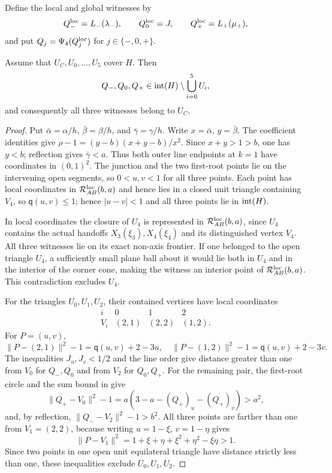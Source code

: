 Define the local and global witnesses by
\begin{equation}
 Q_-^{\rm loc}=L_-(\lambda_-),\qquad
 Q_0^{\rm loc}=J,\qquad
 Q_+^{\rm loc}=L_+(\mu_+),                       \label{eq:asym-witnesses}
\end{equation}
and put $Q_j=\Psi_4(Q_j^{\rm loc})$ for $j\in\{-,0,+\}$.

\begin{lemma}
\label{lem:asymmetric-core-witness}
Assume that $U_C,U_0,\ldots,U_5$ cover $H$.  Then
\[
 Q_-,Q_0,Q_+
 \in\mathrm{int}(H)\setminus\bigcup_{i=0}^5U_i,
\]
and consequently all three witnesses belong to $U_C$.
\end{lemma}

\begin{proof}
Put $\bar\alpha=\alpha/h$, $\bar\beta=\beta/h$, and $\bar\gamma=\gamma/h$.
Write $x=\bar\alpha$, $y=\bar\beta$. The coefficient identities give
$\rho-1=(y-b)(x+y-b)/x^2$. Since $x+y>1>b$, one has $y<b$;
reflection gives $\bar\gamma<a$. Thus both outer line endpoints at
$k=1$ have coordinates in $(0,1)^2$. The junction and the two first-root
points lie on the intervening open segments, so $0<u,v<1$ for all three points.  Each point has local coordinates in $\mathcal R_{AB}^{\rm loc}(b,a)$ and hence
lies in a closed unit triangle containing $V_4$, so
$\mathsf q(u,v)\le1$; hence
$|u-v|<1$ and all three points lie in $\mathrm{int}(H)$.

In local coordinates the closure of $U_4$ is represented in
$\mathcal R_{AB}^{\rm loc}(b,a)$, since $U_4$ contains the actual handoffs
$X_3(\xi_3),X_4(\xi_4)$ and its distinguished vertex $V_4$.  All three witnesses lie
on its exact non-axis frontier.  If one belonged to the open triangle $U_4$,
a sufficiently small plane ball about it would lie both in $U_4$ and in the
interior of the corner cone, making the witness an interior point of
$\mathcal R_{AB}^{\rm loc}(b,a)$. This contradiction excludes $U_4$.

For the triangles $U_0,U_1,U_2$, their contained vertices have local coordinates
\[
 \begin{array}{c|ccc}
 i&0&1&2\\ \hline
 V_i&(2,1)&(2,2)&(1,2).
 \end{array}
\]
For $P=(u,v)$,
\[
 \lVert P-(2,1)\rVert^2-1=\mathsf q(u,v)+2-3u,
 \quad
 \lVert P-(1,2)\rVert^2-1=\mathsf q(u,v)+2-3v.
\]
The inequalities $J_u,J_v<1/2$ and the line order give distance greater than
one from $V_0$ for $Q_-,Q_0$ and from $V_2$ for $Q_0,Q_+$.  For the remaining
pair, the first-root circle and the sum bound in
 give
\[
 \lVert Q_+-V_0\rVert^2-1
 =a(3-a-(Q_+)_u-(Q_+)_v)>a^2,
\]
and, by reflection, $\lVert Q_--V_2\rVert^2-1>b^2$.  All three points are
farther than one from $V_1=(2,2)$, because writing $u=1-\xi$, $v=1-\eta$
gives
\[
 \lVert P-V_1\rVert^2
 =1+\xi+\eta+\xi^2+\eta^2-\xi\eta>1.
\]
Since two points in one open unit equilateral triangle have distance strictly
less than one, these inequalities exclude $U_0,U_1,U_2$.


\end{proof}
